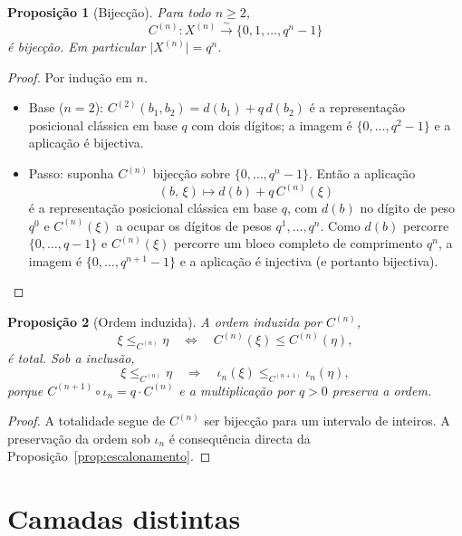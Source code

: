 \documentclass[11pt,a4paper]{article}
\newtheorem{proposicao}{Proposição}
\begin{document}
\begin{proposicao}[Bijecção]
\label{prop:bijecao}
Para todo \(n\ge 2\),
\[
C^{(n)}\colon X^{(n)}\overset{\sim}{\longrightarrow}\{0,1,\dots,q^{n}-1\}
\]
é bijecção.
Em particular \(\lvert X^{(n)}\rvert = q^{n}\).
\end{proposicao}

\begin{proof}
Por indução em \(n\).

\begin{itemize}[leftmargin=1.5em]
\item Base (\(n=2\)): \(C^{(2)}(b_1,b_2)=d(b_1)+q\,d(b_2)\) é a representação posicional clássica em base \(q\) com dois dígitos; a imagem é \(\{0,\dots,q^2-1\}\) e a aplicação é bijectiva.

\item Passo: suponha \(C^{(n)}\) bijecção sobre \(\{0,\dots,q^{n}-1\}\).
Então a aplicação
\[
(b,\, \xi)
\mapsto
d(b)
+
q\, C^{(n)}(\xi)
\]
é a representação posicional clássica em base \(q\), com \(d(b)\) no dígito de peso \(q^0\) e \(C^{(n)}(\xi)\) a ocupar os dígitos de pesos \(q^1,\dots,q^{n}\).
Como \(d(b)\) percorre \(\{0,\dots,q-1\}\) e \(C^{(n)}(\xi)\) percorre um bloco completo de comprimento \(q^{n}\), a imagem é \(\{0,\dots,q^{n+1}-1\}\) e a aplicação é injectiva (e portanto bijectiva).
\end{itemize}
\end{proof}

\begin{proposicao}[Ordem induzida]
\label{prop:ordem}
A ordem induzida por \(C^{(n)}\),
\[
\xi\le_{C^{(n)}}\eta
\quad\iff\quad
C^{(n)}(\xi)\le C^{(n)}(\eta),
\]
é total.
Sob a inclusão,
\[
\xi\le_{C^{(n)}}\eta
\quad\Longrightarrow\quad
\iota_n(\xi)\le_{C^{(n+1)}}\iota_n(\eta),
\]
porque \(C^{(n+1)}\circ\iota_n=q\cdot C^{(n)}\) e a multiplicação por \(q>0\) preserva a ordem.
\end{proposicao}

\begin{proof}
A totalidade segue de \(C^{(n)}\) ser bijecção para um intervalo de inteiros.
A preservação da ordem sob \(\iota_n\) é consequência directa da Proposição~\ref{prop:escalonamento}.
\end{proof}

\section{Camadas distintas}
\end{document}

